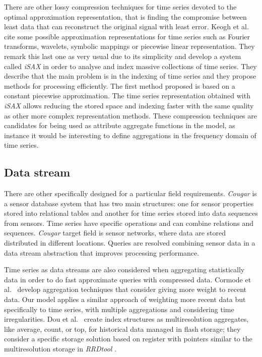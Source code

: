 There are other lossy compression techniques for time series devoted
to the optimal approximation representation, that is finding the
compromise between least data that can reconstruct the original signal
with least error. Keogh et al.\ \cite{keogh01} cite some possible
approximation representations for time series such as Fourier
transforms, wavelets, symbolic mappings or piecewise linear
representation. They remark this last one as very usual due to its
simplicity and develop a system called \emph{iSAX}
\cite{keogh08:isax,keogh10:isax} in order to analyse and index massive
collections of time series. They describe that the main problem is in
the indexing of time series and they propose methods for processing
efficiently. The first method proposed is based on a constant
piecewise approximation. The time series representation obtained with
\emph{iSAX} allows reducing the stored space and indexing faster with
the same quality as other more complex representation methods.  These
compression techniques are candidates for being used as attribute
aggregate functions in the  model, as instance it would be
interesting to define aggregations in the frequency domain of time
series.


 


\subsection{Data stream}



There are other  specifically designed for a particular
field requirements.  \emph{Cougar} \cite{bonnet01} is a sensor
database system that has two main structures: one for sensor
properties stored into relational tables and another for time series
stored into data sequences from sensors. Time series have specific
operations and can combine relations and sequences. \emph{Cougar}
target field is sensor networks, where data are stored distributed in
different locations. Queries are resolved combining sensor data in a
data stream abstraction that improves processing performance.

Time series as data streams are also considered when aggregating
statistically data in order to do fast approximate queries with
compressed data. Cormode et al.\ \cite{cormode08:pods} develop
aggregation techniques that consider giving more weight to recent
data.  Our  model applies a similar approach of
weighting more recent data but specifically to time series, with
multiple aggregations and considering time irregularities.  Dou et
al.\ \cite{dou14:historic_queries_flash_storage} create index
structures as multiresolution aggregates, like average, count, or top,
for historical data managed in flash storage; they consider a specific
storage solution based on register with pointers similar to the
multiresolution storage in \emph{RRDtool} \cite{lisa98:oetiker}.






